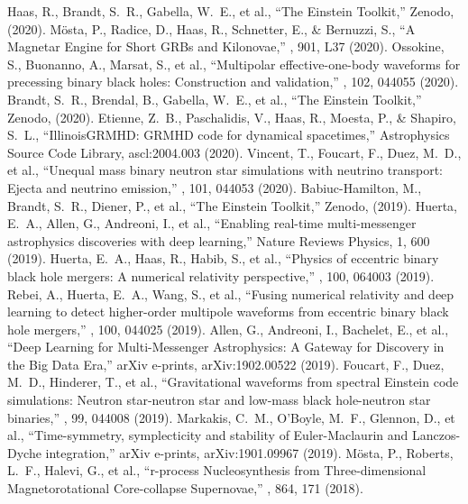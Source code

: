  Haas, R., Brandt, S.~R., Gabella, W.~E., et al., ``The Einstein Toolkit,'' Zenodo, (2020).
 M{\"o}sta, P., Radice, D., Haas, R., Schnetter, E., \& Bernuzzi, S., ``A Magnetar Engine for Short GRBs and Kilonovae,'' \apjl, 901, L37 (2020).
 Ossokine, S., Buonanno, A., Marsat, S., et al., ``Multipolar effective-one-body waveforms for precessing binary black holes: Construction and validation,'' \prd, 102, 044055 (2020).
 Brandt, S.~R., Brendal, B., Gabella, W.~E., et al., ``The Einstein Toolkit,'' Zenodo, (2020).
 Etienne, Z.~B., Paschalidis, V., Haas, R., Moesta, P., \& Shapiro, S.~L., ``IllinoisGRMHD: GRMHD code for dynamical spacetimes,'' Astrophysics Source Code Library, ascl:2004.003 (2020).
 Vincent, T., Foucart, F., Duez, M.~D., et al., ``Unequal mass binary neutron star simulations with neutrino transport: Ejecta and neutrino emission,'' \prd, 101, 044053 (2020).
 Babiuc-Hamilton, M., Brandt, S.~R., Diener, P., et al., ``The Einstein Toolkit,'' Zenodo, (2019).
 Huerta, E.~A., Allen, G., Andreoni, I., et al., ``Enabling real-time multi-messenger astrophysics discoveries with deep learning,'' Nature Reviews Physics, 1, 600 (2019).
 Huerta, E.~A., Haas, R., Habib, S., et al., ``Physics of eccentric binary black hole mergers: A numerical relativity perspective,'' \prd, 100, 064003 (2019).
 Rebei, A., Huerta, E.~A., Wang, S., et al., ``Fusing numerical relativity and deep learning to detect higher-order multipole waveforms from eccentric binary black hole mergers,'' \prd, 100, 044025 (2019).
 Allen, G., Andreoni, I., Bachelet, E., et al., ``Deep Learning for Multi-Messenger Astrophysics: A Gateway for Discovery in the Big Data Era,'' arXiv e-prints, arXiv:1902.00522 (2019).
 Foucart, F., Duez, M.~D., Hinderer, T., et al., ``Gravitational waveforms from spectral Einstein code simulations: Neutron star-neutron star and low-mass black hole-neutron star binaries,'' \prd, 99, 044008 (2019).
 Markakis, C.~M., O'Boyle, M.~F., Glennon, D., et al., ``Time-symmetry, symplecticity and stability of Euler-Maclaurin and Lanczos-Dyche integration,'' arXiv e-prints, arXiv:1901.09967 (2019).
 M{\"o}sta, P., Roberts, L.~F., Halevi, G., et al., ``r-process Nucleosynthesis from Three-dimensional Magnetorotational Core-collapse Supernovae,'' \apj, 864, 171 (2018).
